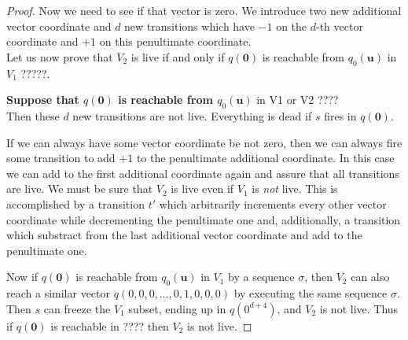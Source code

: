 \begin{proof}

Now we need to see if that vector is zero.
We introduce two new additional vector coordinate and $d$ new transitions which have
$-1$ on the $d$-th vector coordinate and $+1$ on this penultimate coordinate. \\


Let us now prove that $V_2$ is live if and only if 
$q(\textbf{0})$
is reachable from $q_0(\textbf{u})$ in $V_1$ ?????.

{\bf Suppose that $q(\textbf{0})$ is reachable from $q_0(\textbf{u})$} in V1 or V2 ????\\
Then these  $d$ new transitions are not live. Everything  is dead if $s$ fires in $q(\textbf{0})$.


If we can always have some vector coordinate be not zero, then we can always fire some transition to add $+1$ to the penultimate additional coordinate.
In this case we can add to the first additional coordinate again and assure that all transitions are live.
We must be sure that $V_2$ is live even if $V_1$ is {\em not} live.
This is accomplished by a transition $t'$  %
which arbitrarily increments every other vector coordinate 
while decrementing the penultimate one and, additionally, a transition which 
substract from the last additional vector coordinate and add to the penultimate one. 

Now if $q(\textbf{0})$ is reachable from $q_0(\textbf{u})$ in $V_1$ by a sequence $\sigma$, then $V_2$ can also reach a similar
vector $q(0,0,0,\ldots, 0, 1,0,0,0)$ by executing the same sequence $\sigma$.
Then $s$ can freeze the $V_1$ subset, 
ending up in $q(0^{d+4})$, and $V_2$ is not live.
Thus if $q(\textbf{0})$ is reachable in ???? then $V_2$ is not live.



\end{proof}
